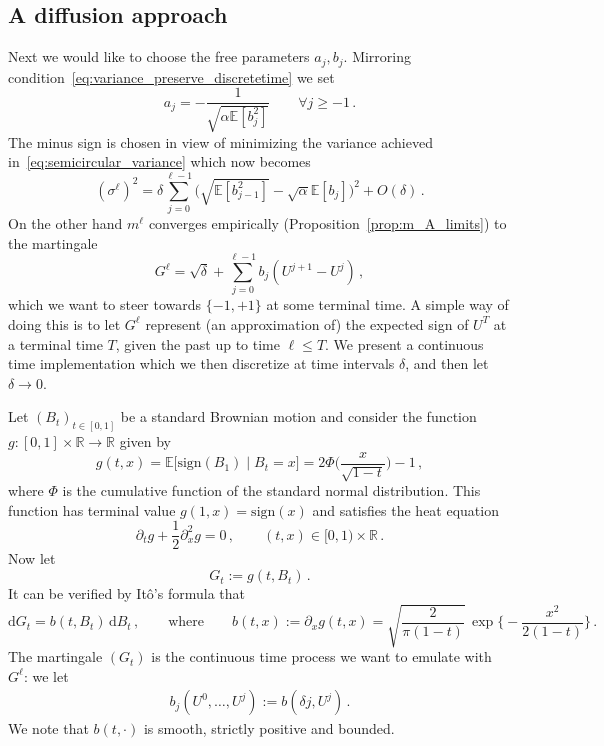 \documentclass[11pt]{article}
\theoremstyle{definition}
\theoremstyle{remark}
\numberwithin{equation}{section}
\numberwithin{theorem}{section}
\newcommand{\R}{\mathbb R}
\newcommand{\E}{\mathbb E}
\newcommand{\rmd}{\mathrm{d}}
\begin{document}
\subsection{A diffusion approach}
Next we would like to choose the free parameters $a_j,b_j$. Mirroring condition~\eqref{eq:variance_preserve_discretetime} we set
\begin{equation}\label{eq:choice_a}
a_j = - \frac{1}{\sqrt{\alpha \E[b_j^2]}}
\qquad \forall j \ge -1\,.	
\end{equation}
The minus sign is chosen in view of minimizing the variance achieved in~\eqref{eq:semicircular_variance} which now becomes
\begin{equation}\label{eq:variance_1}
(\sigma^\ell)^2  = \delta \sum_{j=0}^{\ell-1}\Big(\sqrt{\E[b_{j-1}^2]} - \sqrt{\alpha} \E[b_j]\Big)^2  + O(\delta)\,.
\end{equation}
On the other hand $m^\ell$ converges empirically (Proposition~\ref{prop:m_A_limits}) to the martingale  
\begin{equation}\label{eq:Muhat}
	G^\ell = \sqrt{\delta} + \sum_{j=0}^{\ell-1} b_j (U^{j+1}-U^j)\,,
\end{equation} 
which we want to steer towards $\{-1,+1\}$ at some terminal time. A simple way of doing this is to let $G^\ell$ represent (an approximation of) the expected sign of $U^T$ at a terminal time $T$, given the past up to time $\ell \le T$. We present a continuous time implementation which we then discretize at time intervals $\delta$, and then let $\delta \to 0$. 

Let $(B_t)_{t \in [0,1]}$ be a standard Brownian motion and consider the function $g: [0,1]\times \R \to \R$ given by  
\begin{equation}\label{eq:heat_equation_solution}
	g(t,x) = \E\big[\mathrm{sign}(B_1) \mid  B_t=x\big] = 2 \Phi\Big(\frac{x}{\sqrt{1-t}}\Big)-1\,,
\end{equation}
where $\Phi$ is the cumulative function of the standard normal distribution.  
This function has terminal value $g(1,x) = \mathrm{sign}(x)$ and satisfies the heat equation 
\begin{equation}\label{eq:heat_equation}
	\partial_t g + \frac{1}{2}\partial_{x}^2 g = 0\,,\qquad (t, x) \in [0,1) \times \R \,.
\end{equation}
 Now let  
 \begin{equation}\label{eq:G_t}
 	G_t := g(t,B_t)\,.
 \end{equation}
It can be verified by It\^{o}'s formula that 
\begin{equation}\label{eq:heat-control-correct}
	\rmd G_t = b(t,B_t) \,\rmd B_t\,, \qquad \mbox{where}\qquad b(t,x) := \partial_x g(t,x) = \sqrt{\frac{2}{\pi(1-t)}} \,\exp\Big\{-\frac{x^2}{2(1-t)}\Big\}\,. 
\end{equation}
The martingale $(G_t)$ is the continuous time process we want to emulate with $G^\ell$: we let
\begin{align}\label{eq:choice_b1prime}
b_j(U^0,\ldots,U^j) := b(\delta j, U^j) \,. 
\end{align}
We note that $b(t,\cdot)$ is smooth, strictly positive and bounded. 
\end{document}
